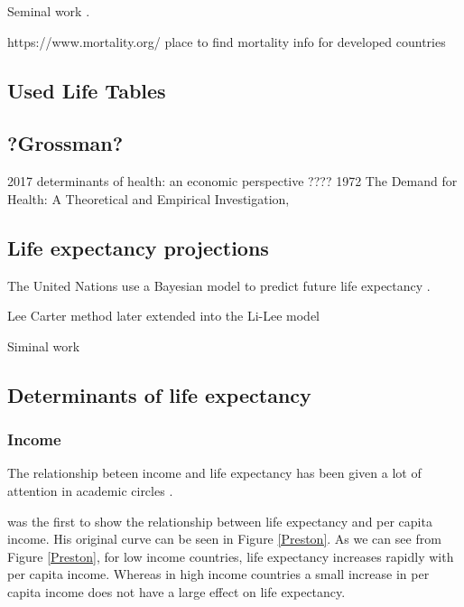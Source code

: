 \documentclass[10pt,a4paper]{article}
\begin{document}
Seminal work \cite{Fergany1971}.

https://www.mortality.org/ place to find mortality info for developed countries


\subsection{Used Life Tables}
\cite{Luy2019}



\subsection{?Grossman?}
2017 determinants of health: an economic perspective  ????
1972 The Demand for Health: A Theoretical and Empirical Investigation,

\cite{Grossman2000}

\subsection{Life expectancy projections}

The United Nations use a Bayesian model to predict future life expectancy \citep{Raftery2014}.

Lee Carter method \cite{Shang2011} later extended into the Li-Lee model

Siminal work \cite{Lee1992}

\cite{Bongaarts2005}

\subsection{Determinants of life expectancy}



\subsubsection{Income}

The relationship beteen income and life expectancy has been given a lot of attention in academic circles \citep{Preston1975, Hu2015, Chetty2016, Oeppen2019}. 

\cite{Preston1975} was the first to show the relationship between life expectancy and per capita income. His original curve can be seen in Figure \ref{Preston}. As we can see from Figure \ref{Preston}, for low income countries, life expectancy increases rapidly with per capita income. Whereas in high income countries a small increase in per capita income does not have a large effect on life expectancy.
\end{document}
